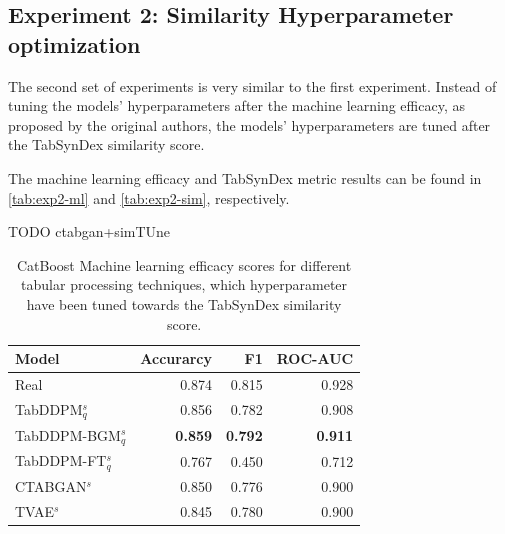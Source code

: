 \subsection{Experiment 2: Similarity Hyperparameter optimization}
\label{ch:Experiment-2}

The second set of experiments is very similar to the first experiment.
Instead of tuning the models' hyperparameters after the machine learning efficacy, as proposed by the original authors,
the models' hyperparameters are tuned after the TabSynDex similarity score.

The machine learning efficacy and TabSynDex metric results can be found in \autoref{tab:exp2-ml} and \autoref{tab:exp2-sim}, respectively.

TODO ctabgan+simTUne

\begin{table}[h]
	\centering
	\begin{tabular}{lrrr}
		\toprule
		\textbf{Model}        & \textbf{Accurarcy} & \textbf{F1}    & \textbf{ROC-AUC} \\
		\midrule
		Real                  & 0.874              & 0.815          & 0.928            \\
		TabDDPM$^{s}_{q}$     & 0.856              & 0.782          & 0.908            \\
		TabDDPM-BGM$^{s}_{q}$ & \textbf{0.859}     & \textbf{0.792} & \textbf{0.911}   \\
		TabDDPM-FT$^{s}_{q}$  & 0.767              & 0.450          & 0.712            \\
		CTABGAN$^{s}$         & 0.850              & 0.776          & 0.900            \\
		TVAE$^{s}$            & 0.845              & 0.780          & 0.900            \\
		\bottomrule
	\end{tabular}
	\caption[Experiment 2 ML-Efficacy]{CatBoost Machine learning efficacy scores for different tabular processing techniques, which hyperparameter have been tuned towards the TabSynDex similarity score.}
	\label{tab:exp2-ml}
\end{table}

